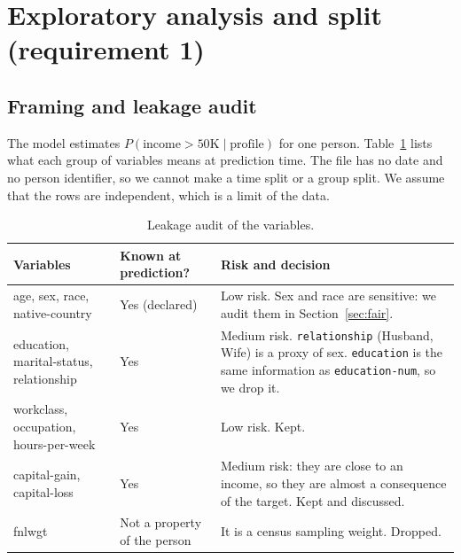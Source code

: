 \documentclass[11pt,a4paper]{article}
\begin{document}
\section{Exploratory analysis and split (requirement 1)}\label{sec:eda}
\subsection{Framing and leakage audit}
The model estimates $P(\text{income} > 50\text{K} \mid \text{profile})$ for one person. Table~\ref{tab:audit} lists what each group of variables means at prediction time. The file has no date and no person identifier, so we cannot make a time split or a group split. We assume that the rows are independent, which is a limit of the data.

\begin{table}[!t]
\centering\small
\begin{tabular}{p{3.3cm}p{3.1cm}p{7.3cm}}
\toprule
Variables & Known at prediction? & Risk and decision \\
\midrule
age, sex, race, native-country & Yes (declared) & Low risk. Sex and race are sensitive: we audit them in Section~\ref{sec:fair}. \\
education, marital-status, relationship & Yes & Medium risk. \texttt{relationship} (Husband, Wife) is a proxy of sex. \texttt{education} is the same information as \texttt{education-num}, so we drop it. \\
workclass, occupation, hours-per-week & Yes & Low risk. Kept. \\
capital-gain, capital-loss & Yes & Medium risk: they are close to an income, so they are almost a consequence of the target. Kept and discussed. \\
fnlwgt & Not a property of the person & It is a census sampling weight. Dropped. \\
\bottomrule
\end{tabular}
\caption{Leakage audit of the variables.}\label{tab:audit}
\end{table}
\end{document}

